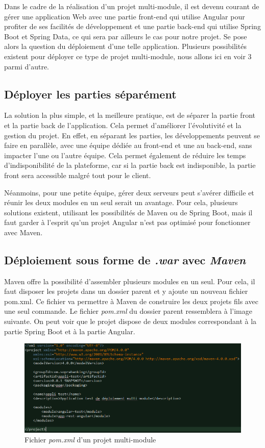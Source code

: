\documentclass{polytech/polytech}
\begin{document}
Dans le cadre de la réalisation d’un projet multi-module, il est devenu courant de gérer une application Web avec une partie front-end qui utilise Angular pour profiter de ses facilités de développement et une partie back-end qui utilise Spring Boot et Spring Data, ce qui sera par ailleurs le cas pour notre projet. Se pose alors la question du déploiement d’une telle application. Plusieurs possibilités existent pour déployer ce type de projet multi-module, nous allons ici en voir 3 parmi d’autre.

\subsection{Déployer les parties séparément}

La solution la plus simple, et la meilleure pratique, est de séparer la partie front et la partie back de l’application. Cela permet d’améliorer l’évolutivité et la gestion du projet. En effet, en séparant les parties, les développements peuvent se faire en parallèle, avec une équipe dédiée au front-end et une au back-end, sans impacter l’une ou l’autre équipe. Cela permet également de réduire les temps d’indisponibilité de la plateforme, car si la partie back est indisponible, la partie front sera accessible malgré tout pour le client.

Néanmoins, pour une petite équipe, gérer deux serveurs peut s’avérer difficile et réunir les deux modules en un seul serait un avantage. Pour cela, plusieurs solutions existent, utilisant les possibilités de Maven ou de Spring Boot, mais il faut garder à l’esprit qu’un projet Angular n’est pas optimisé pour fonctionner avec Maven. 

\subsection{Déploiement sous forme de \textit{.war} avec \textit{Maven}}

Maven offre la possibilité d’assembler plusieurs modules en un seul. Pour cela, il faut disposer les projets dans un dossier parent et y ajoute un nouveau fichier pom.xml. Ce fichier va permettre à Maven de construire les deux projets fils avec une seul commande. Le fichier \textit{pom.xml} du dossier parent ressemblera à l’image suivante. On peut voir que le projet dispose de deux modules correspondant à la partie Spring Boot et à la partie Angular. 


\begin{figure}
	\includegraphics[scale=0.6]{images/pomParent}
	\caption{Fichier \textit{pom.xml} d'un projet multi-module}
	\label{fig:pomMultiApp}
\end{figure}
\end{document}
